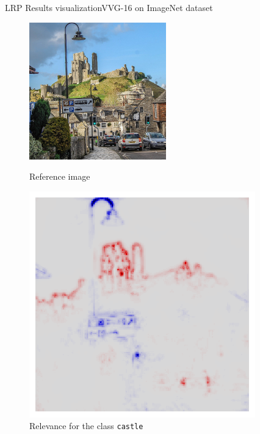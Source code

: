 \documentclass[aspectratio=169]{beamer}
\theoremstyle{definition}
\begin{document}
\begin{frame}{LRP Results visualization}{VVG-16 on ImageNet dataset}
    \begin{figure}[ht]
        \begin{minipage}[c]{0.45\linewidth}
            \centering
            \includegraphics[width=.8\textwidth]{castle.jpg}
            \caption{Reference image}
        \end{minipage}
        \hspace{0.25cm}
        \begin{minipage}[c]{0.45\linewidth}
            \centering
            \includegraphics[width=.8\textwidth]{castle-lrp.png}
            \caption{Relevance for the class \texttt{castle}}
        \end{minipage}
    \end{figure}
\end{frame}
\end{document}
